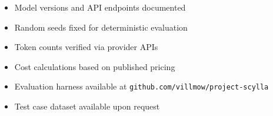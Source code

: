 \documentclass[11pt]{article}
\begin{document}
\begin{itemize}
    \item[$\square$] Model versions and API endpoints documented
    \item[$\square$] Random seeds fixed for deterministic evaluation
    \item[$\square$] Token counts verified via provider APIs
    \item[$\square$] Cost calculations based on published pricing
    \item[$\square$] Evaluation harness available at \texttt{github.com/villmow/project-scylla}
    \item[$\square$] Test case dataset available upon request
\end{itemize}
\end{document}
